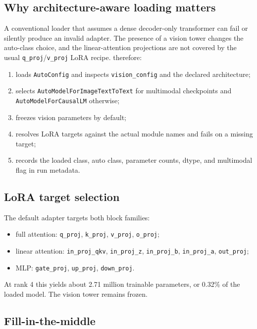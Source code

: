 \subsection{Why architecture-aware loading matters}

A conventional loader that assumes a dense decoder-only transformer can fail or
silently produce an invalid adapter. The presence of a vision tower changes the
auto-class choice, and the linear-attention projections are not covered by the
usual \texttt{q\_proj}/\texttt{v\_proj} LoRA recipe. \cyberlite{} therefore:

\begin{enumerate}[leftmargin=1.4em]
  \item loads \texttt{AutoConfig} and inspects \texttt{vision\_config} and the
  declared architecture;
  \item selects \texttt{AutoModelForImageTextToText} for multimodal checkpoints
  and \texttt{AutoModelForCausalLM} otherwise;
  \item freezes vision parameters by default;
  \item resolves LoRA targets against the actual module names and fails on a
  missing target;
  \item records the loaded class, auto class, parameter counts, dtype, and
  multimodal flag in run metadata.
\end{enumerate}

\subsection{LoRA target selection}

The default adapter targets both block families:
\begin{itemize}[leftmargin=1.4em]
  \item full attention: \texttt{q\_proj}, \texttt{k\_proj}, \texttt{v\_proj},
  \texttt{o\_proj};
  \item linear attention: \texttt{in\_proj\_qkv}, \texttt{in\_proj\_z},
  \texttt{in\_proj\_b}, \texttt{in\_proj\_a}, \texttt{out\_proj};
  \item MLP: \texttt{gate\_proj}, \texttt{up\_proj}, \texttt{down\_proj}.
\end{itemize}
At rank 4 this yields about 2.71 million trainable parameters, or 0.32\% of the
loaded model. The vision tower remains frozen.

\subsection{Fill-in-the-middle}

